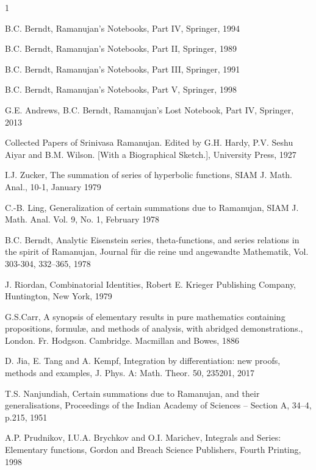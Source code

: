 \documentclass[11pt,oneside,reqno]{article}
\theoremstyle{definition}
\begin{document}
\begin{thebibliography}{1}

B.C.  Berndt, Ramanujan's Notebooks, Part IV, Springer, 1994

B.C.  Berndt, Ramanujan's Notebooks, Part II, Springer, 1989

B.C.  Berndt, Ramanujan's Notebooks, Part III, Springer, 1991

B.C.  Berndt, Ramanujan's Notebooks, Part V, Springer, 1998

G.E. Andrews, B.C. Berndt,
Ramanujan’s
Lost Notebook, Part IV, Springer, 2013

 Collected Papers of Srinivasa Ramanujan. Edited by G.H. Hardy, P.V. Seshu Aiyar and B.M. Wilson. [With a Biographical Sketch.], University Press, 1927

I.J. Zucker, The summation of series of hyperbolic
functions, SIAM J. Math. Anal., 10-1, January 1979

C.-B. Ling, Generalization of certain summations due
to Ramanujan, SIAM J. Math. Anal. Vol. 9, No. 1, February 1978

B.C. Berndt, Analytic Eisenstein series, theta-functions,
and series relations in the spirit of Ramanujan, Journal für die reine
und angewandte Mathematik, Vol. 303-304,  332--365, 1978

J. Riordan, Combinatorial Identities, Robert E. Krieger Publishing Company, Huntington, New York, 1979

G.S.Carr, A synopsis of elementary results in pure mathematics containing propositions, formul\ae, and methods of analysis, with abridged demonstrations., London. Fr. Hodgson. Cambridge. Macmillan and Bowes, 1886

D. Jia, E. Tang and A. Kempf, Integration by differentiation: new proofs, methods and examples, J. Phys. A: Math. Theor. 50, 235201, 2017

T.S. Nanjundiah, Certain summations due to Ramanujan, and their generalisations, Proceedings of the Indian Academy of Sciences -- Section A, 34--4, p.215, 1951

A.P. Prudnikov, I.U.A. Brychkov and O.I. Marichev, Integrals and Series: Elementary functions,
Gordon and Breach Science Publishers, Fourth Printing, 1998


\end{thebibliography}
\end{document}
